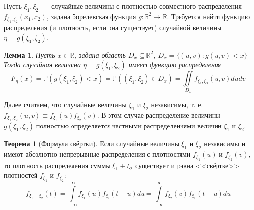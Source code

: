 \documentclass[oneside,final,14pt]{extreport}
\theoremstyle{plain}
\newtheorem*{lem}{Лемма}
\theoremstyle{definition}
\theoremstyle{named}
\newtheorem*{namedthm}{Теорема}
\begin{document}
Пусть $\xi_1, \xi_2$~--- случайные величины с плотностью совместного распределения $f_{\xi_{1}, \xi_{2}}\left(x_{1}, x_{2}\right)$, задана борелевская функция $g: \mathbb{R}^{2} \rightarrow \mathbb{R}$. Требуется найти функцию распределения (и плотность, если она существует) случайной величины $\eta=g\left(\xi_{1}, \xi_{2}\right)$.
\begin{lem}
    Пусть $x \in \mathbb{R}$, задана область $D_{x} \subseteq \mathbb{R}^{2},~ D_x = \{(u,v): g(u,v) < x\}$ Тогда случайная величина $\eta=g\left(\xi_{1}, \xi_{2}\right)$ имеет функцию распределения
    \begin{equation*}
        F_{\eta}(x)=\mathbb{P}\left(g\left(\xi_{1}, \xi_{2}\right)<x\right)=\mathbb{P}\left(\left(\xi_{1}, \xi_{2}\right) \in D_{x}\right)=\iint\limits_{D_{x}} f_{\xi_{1}, \xi_{2}}(u, v) d u d v
    \end{equation*}
\end{lem}
Далее считаем, что случайные величины $\xi_1$ и $\xi_2$ независимы, т. е. $f_{\xi_{1}, \xi_{2}}(u, v) \equiv f_{\xi_{1}}(u) f_{\xi_{2}}(v)$. В этом случае распределение величины $g\left(\xi_{1}, \xi_{2}\right)$ полностью определяется частными распределениями величин $\xi_1$ и $\xi_2$.
\begin{namedthm}[Формула свёртки]
    Если случайные величины $\xi_1$ и $\xi_2$ независимы и имеют абсолютно непрерывные распределения с плотностями $f_{\xi_{1}}(u)$ и $f_{\xi_{2}}(v)$, то плотность распределения суммы $\xi_{1}+\xi_{2}$ существует и равна <<свёртке>> плотностей $f_{\xi_{1}}$ и $f_{\xi_{2}}$:
    \begin{equation*}
        f_{\xi_{1}+\xi_{2}}(t)=\int\limits_{-\infty}^{\infty} f_{\xi_{1}}(u) f_{\xi_{2}}(t-u) d u=\int\limits_{-\infty}^{\infty} f_{\xi_{2}}(u) f_{\xi_{1}}(t-u) d u
    \end{equation*}
\end{namedthm}
\end{document}
